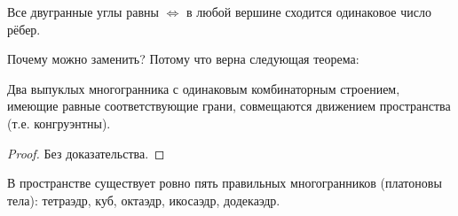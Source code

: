 \begin{remark}
    Все двугранные углы равны $\Longleftrightarrow$ в любой вершине сходится одинаковое число рёбер.
\end{remark}

Почему можно заменить? Потому что верна следующая теорема:

\begin{theorem}[Коши]
    Два выпуклых многогранника с одинаковым комбинаторным строением, имеющие равные соответствующие грани, совмещаются движением пространства (т.е. конгруэнтны).
\end{theorem}
\begin{proof}
    Без доказательства.
\end{proof}

\begin{theorem}
    В пространстве существует ровно пять правильных многогранников (платоновы тела): тетраэдр, куб, октаэдр, икосаэдр, додекаэдр.
\end{theorem}
